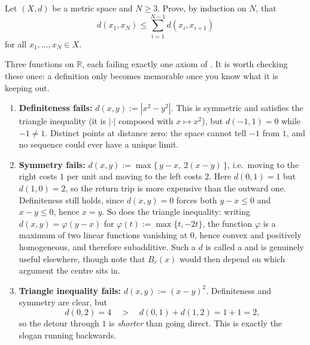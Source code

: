 \begin{exercise}
\label{ex:polygon_inequality}
Let $(X,d)$ be a metric space and $N \geq 3$. Prove, by induction on $N$, that
\[d(x_1,x_N) \leq \sum_{i=1}^{N-1} d(x_i,x_{i+1})\]
for all $x_1,\dots,x_N \in X$.
\end{exercise}

\begin{aiexample}
\label{ex:metric_axioms_are_needed}
Three functions on $\mathbb{R}$, each failing exactly one axiom of
. It is worth checking these once: a definition only becomes memorable
once you know what it is keeping out.
\begin{enumerate}[label=\textbf{(\alph*)}]
  \item \textbf{Definiteness fails:} $d(x,y) := |x^2-y^2|$. This is symmetric and satisfies the
    triangle inequality (it is $|\cdot|$ composed with $x \mapsto x^2$), but
    $d(-1,1) = 0$ while $-1 \neq 1$. Distinct points at distance zero: the space cannot tell
    $-1$ from $1$, and no sequence could ever have a unique limit.
  \item \textbf{Symmetry fails:} $d(x,y) := \max\{\,y-x,\ 2(x-y)\,\}$, i.e.\ moving to the right
    costs $1$ per unit and moving to the left costs $2$. Here $d(0,1)=1$ but $d(1,0)=2$, so the
    return trip is more expensive than the outward one. Definiteness still holds, since
    $d(x,y) = 0$ forces both $y - x \leq 0$ and $x - y \leq 0$, hence $x = y$. So does the
    triangle inequality: writing $d(x,y) = \varphi(y-x)$ for $\varphi(t) := \max\{t,-2t\}$, the
    function $\varphi$ is a maximum of two linear functions vanishing at $0$, hence convex and
    positively homogeneous, and therefore subadditive. Such a $d$ is called a
     and is genuinely useful elsewhere, though note that $B_r(x)$ would then
    depend on which argument the centre sits in.
  \item \textbf{Triangle inequality fails:} $d(x,y) := (x-y)^2$. Definiteness and symmetry are
    clear, but
    \[d(0,2) = 4 \quad > \quad d(0,1)+d(1,2) = 1+1 = 2,\]
    so the detour through $1$ is \emph{shorter} than going direct. This is exactly the
     slogan running backwards.
\end{enumerate}
\end{aiexample}

